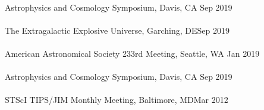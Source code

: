\documentclass[10pt]{cv}
\begin{document}
\begin{llist}
\\
Astrophysics and Cosmology Symposium, Davis, CA \hfill Sep 2019\\\vspace{-0.1in}  
\\
The Extragalactic Explosive Universe, Garching, DE\hfill Sep 2019\\ \vspace{-0.1in} 
\\
American Astronomical Society 233rd Meeting,  Seattle, WA \hfill Jan 2019\\\vspace{-0.1in}  
\\
Astrophysics and Cosmology Symposium, Davis, CA \hfill Sep 2019\\\vspace{-0.1in}  
\\
STScI TIPS/JIM Monthly Meeting, Baltimore, MD\hfill Mar 2012\\\vspace{-0.1in}  


\end{llist}
\end{document}
